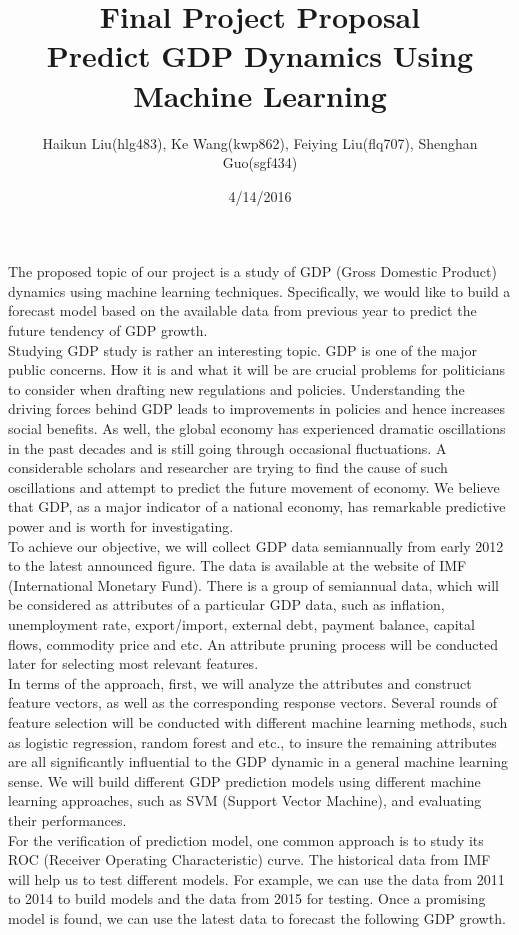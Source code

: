 \documentclass[11pt]{article} %
\title{Final Project Proposal\\Predict GDP Dynamics Using Machine Learning}
\author{Haikun Liu(hlg483), Ke Wang(kwp862), Feiying Liu(flq707), Shenghan Guo(sgf434)}
\date{4/14/2016} %
\begin{document}
\maketitle

\hspace{.3cm}The proposed topic of our project is a study of GDP (Gross Domestic Product) dynamics using machine learning techniques. Specifically, we would like to build a forecast model based on the available data from previous year to predict the future tendency of GDP growth. \\

\hspace{.3cm}Studying GDP study is rather an interesting topic. GDP is one of the major public concerns. How it is and what it will be are crucial problems for politicians to consider when drafting new regulations and policies. Understanding the driving forces behind GDP leads to improvements in policies and hence increases social benefits. As well, the global economy has experienced dramatic oscillations in the past decades and is still going through occasional fluctuations. A considerable scholars and researcher are trying to find the cause of such oscillations and attempt to predict the future movement of economy. We believe that GDP, as a major indicator of a national economy, has remarkable predictive power and is worth for investigating.\\

\hspace{.3cm}To achieve our objective, we will collect GDP data semiannually from early 2012 to the latest announced figure. The data is available at the website of IMF (International Monetary Fund). There is a group of semiannual data, which will be considered as attributes of a particular GDP data, such as inflation, unemployment rate, export/import, external debt, payment balance, capital flows, commodity price and etc. An attribute pruning process will be conducted later for selecting most relevant features.\\

\hspace{.3cm}In terms of the approach, first, we will analyze the attributes and construct feature vectors, as well as the corresponding response vectors. Several rounds of feature selection will be conducted with different machine learning methods, such as logistic regression, random forest and etc., to insure the remaining attributes are all significantly influential to the GDP dynamic in a general machine learning sense. We will build different GDP prediction models using different machine learning approaches, such as SVM (Support Vector Machine), and evaluating their performances.\\

\hspace{.3cm}For the verification of prediction model, one common approach is to study its ROC (Receiver Operating Characteristic) curve. The historical data from IMF will help us to test different models. For example, we can use the data from 2011 to 2014 to build models and the data from 2015 for testing. Once a promising model is found, we can use the latest data to forecast the following GDP growth.\\
\end{document}
